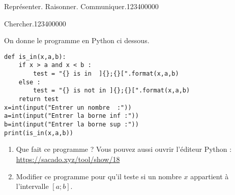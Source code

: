 \begin{pageParcoursd}
\begin{ExoCd}{Représenter. Raisonner. Communiquer.}{1234}{0}{0}{0}{0}{0}
\begin{minipage}{0.48\linewidth}
\begin{enumerate}
\end{enumerate}

\end{minipage} 
\end{ExoCd}

\begin{ExoCd}{Chercher.}{1234}{0}{0}{0}{0}{0}

On donne le programme en Python ci dessous. 
 
\begin{lstlisting}
def is_in(x,a,b):
    if x > a and x < b :
    	test = "{} is in  ]{};{}[".format(x,a,b) 
    else :
        test = "{} is not in ]{};{}[".format(x,a,b) 
    return test    
x=int(input("Entrer un nombre  :")) 
a=int(input("Entrer la borne inf :"))
b=int(input("Entrer la borne sup :"))    
print(is_in(x,a,b))
\end{lstlisting}
 


\begin{enumerate}
\item Que fait ce programme ? Vous pouvez aussi ouvrir l'éditeur Python : \url{https://sacado.xyz/tool/show/18}
\item Modifier ce programme pour qu'il teste si un nombre $x$ appartient à l'intervalle $[a;b]$.
\end{enumerate} 
\end{ExoCd}

\end{pageParcoursd} %


